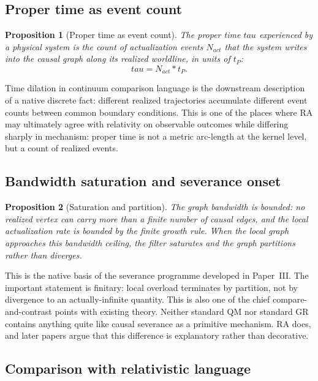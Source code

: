 \documentclass[11pt]{article}
\def\tau{tau}%
\def\mathrm#1{#1}%
\def\cdot{*}%
\newtheorem{proposition}{Proposition}
\begin{document}
\subsection{Proper time as event count}

\begin{proposition}[Proper time as event count]
\label{prop:proper_time}
The proper time $\tau$ experienced by a physical system is the count of actualization events $N_{\mathrm{act}}$ that the system writes into the causal graph along its realized worldline, in units of $t_P$:
\begin{equation}
\tau = N_{\mathrm{act}} \cdot t_P.
\end{equation}
\end{proposition}

Time dilation in continuum comparison language is the downstream description of a native discrete fact: different realized trajectories accumulate different event counts between common boundary conditions. This is one of the places where RA may ultimately agree with relativity on observable outcomes while differing sharply in mechanism: proper time is not a metric arc-length at the kernel level, but a count of realized events.

\subsection{Bandwidth saturation and severance onset}

\begin{proposition}[Saturation and partition]
\label{prop:singularity}
The graph bandwidth is bounded: no realized vertex can carry more than a finite number of causal edges, and the local actualization rate is bounded by the finite growth rule. When the local graph approaches this bandwidth ceiling, the filter saturates and the graph partitions rather than diverges.
\end{proposition}

This is the native basis of the severance programme developed in Paper~III. The important statement is finitary: local overload terminates by partition, not by divergence to an actually-infinite quantity. This is also one of the chief compare-and-contrast points with existing theory. Neither standard QM nor standard GR contains anything quite like causal severance as a primitive mechanism. RA does, and later papers argue that this difference is explanatory rather than decorative.

\subsection{Comparison with relativistic language}
\end{document}
